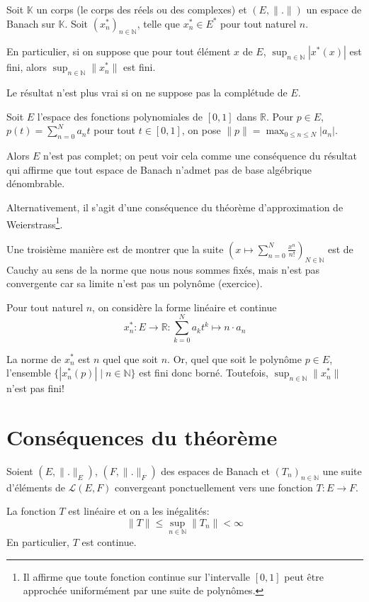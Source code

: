 Soit $ \mathbb K$ un corps (le corps des réels ou des complexes)
et $(E, \|.\|)$ un espace de Banach sur $\mathbb K$. Soit
$(x^*_n)_{n\in\mathbb N}$, telle que $x^*_n\in E^*$ pour tout naturel $n$.

En particulier, si on suppose que pour tout élément $x$ de $E$,
$\sup_{n\in\mathbb N}|x^*(x)|$ est fini, alors
$\sup_{n\in\mathbb N}\|x^*_n\|$  est fini.

Le résultat n'est plus vrai si on ne suppose pas la complétude de
$E$.
\begin{ex}
  Soit $E$ l'espace des fonctions polynomiales de $[0, 1]$
  dans $\mathbb R$. Pour $p\in E$, $p(t) =
  \sum_{n=0}^Na_n t$ pour tout $t\in [0, 1]$, on pose
  $\|p\| = \max_{0\leq n\leq N}|a_n|$.

  Alors $E$ n'est pas complet; on peut voir cela comme une conséquence
  du résultat qui affirme que tout espace de Banach n'admet pas
  de base algébrique dénombrable.

  Alternativement, il s'agit d'une conséquence du théorème d'approximation
  de Weierstrass\footnote{
    Il affirme que toute fonction
    continue sur l'intervalle $[0, 1]$ peut être approchée uniformément
    par une suite de polynômes.}.

  Une troisième manière est de montrer
  que la suite $\displaystyle{
    \left(x\mapsto \sum_{n=0}^N\frac{x^n}{n!}\right)_{N\in\mathbb N}}
  $ est de
  Cauchy au sens de la norme que nous nous sommes fixés, mais n'est
  pas convergente car sa limite n'est pas un polynôme (exercice).

  Pour tout naturel $n$, on considère la forme linéaire et continue
  $$x^*_n: E\to \mathbb R: \sum_{k=0}^Na_kt^k\mapsto n \cdot a_n$$

  La norme de $x^*_n$ est $n$ quel que soit $n$. Or, quel que
  soit le polynôme $p\in E$, l'ensemble $\{|x^*_n(p)|\mid n\in\mathbb N\}$
  est fini donc borné. Toutefois, $\sup_{n\in\mathbb N} \|x^*_n\|$
  n'est pas fini!
\end{ex}

\section{Conséquences du théorème}

\begin{cor}
  Soient $(E, \|.\|_E)$, $(F, \|.\|_F)$ des espaces de Banach et
  $(T_n)_{n\in\mathbb N}$ une suite d'éléments de $\mathscr{L}(E, F)$
  convergeant ponctuellement vers une fonction $T: E\to F$.

  La fonction $T$ est linéaire et on a les inégalités:
  $$\|T\| \leq \sup_{n\in\mathbb N}\|T_n\| < \infty$$
  En particulier, $T$ est continue.
\end{cor}

